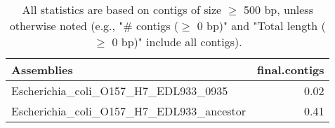 \documentclass[12pt,a4paper]{article}
\begin{document}
\begin{table}[ht]
\begin{center}
\caption{All statistics are based on contigs of size $\geq$ 500 bp, unless otherwise noted (e.g., "\# contigs ($\geq$ 0 bp)" and "Total length ($\geq$ 0 bp)" include all contigs).}
\begin{tabular}{|l*{1}{|r}|}
\hline
Assemblies & final.contigs \\ \hline
Escherichia\_coli\_O157\_H7\_EDL933\_0935 & 0.02 \\ \hline
Escherichia\_coli\_O157\_H7\_EDL933\_ancestor & 0.41 \\ \hline
\end{tabular}
\end{center}
\end{table}
\end{document}
